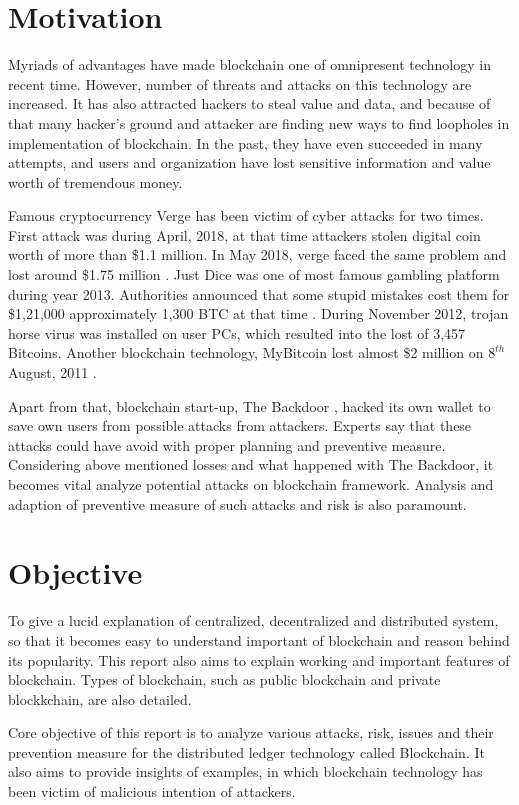 \documentclass[a4paper,twoside,12pt]{report}
\begin{document}
\begin{spacing}{1.5}
\section{Motivation}
Myriads of advantages have made blockchain one of omnipresent technology in recent time. However, number of threats and attacks on this technology are increased. It has also attracted hackers to steal value and data, and because of that many hacker's ground and attacker are finding new ways to find loopholes in implementation of blockchain. In the past, they have even succeeded in many attempts, and users and organization have lost sensitive information and value worth of tremendous money.
\par
Famous cryptocurrency Verge has been victim of cyber attacks for two times. First attack was during April, 2018, at that time attackers stolen digital coin worth of more than \$1.1 million. In May 2018, verge faced the same problem and lost around \$1.75 million \cite{verge_51_attack}. Just Dice was one of most famous gambling platform during year 2013. Authorities announced that some stupid mistakes cost them for \$1,21,000 approximately 1,300 BTC at that time \cite{all_bitcoin_scam}. During November 2012, trojan horse virus was installed on user PCs, which resulted into the lost of 3,457 Bitcoins. Another blockchain technology, MyBitcoin lost almost \$2 million on $8^{th}$ August, 2011 \cite{mybitcoin_hack}. 
\par
Apart from that, blockchain start-up, The Backdoor , hacked its own wallet to save own users from possible attacks from attackers. Experts say that these attacks could have avoid with proper planning and preventive measure. Considering above mentioned losses and what happened with The Backdoor, it becomes vital analyze potential attacks on blockchain framework. Analysis and adaption of preventive measure of such attacks and risk is also paramount. 

\section{Objective}
To give a lucid explanation of centralized, decentralized and distributed system, so that it becomes easy to understand important of blockchain and reason behind its popularity. This report also aims to explain working and important features of blockchain. Types of blockchain, such as public blockchain and private blockkchain, are also detailed.  
\par
Core objective of this report is to analyze various attacks, risk, issues and their prevention measure for the distributed ledger technology called Blockchain. It also aims to provide insights of examples, in which blockchain technology has been victim of malicious intention of attackers.

\end{spacing}
\end{document}
